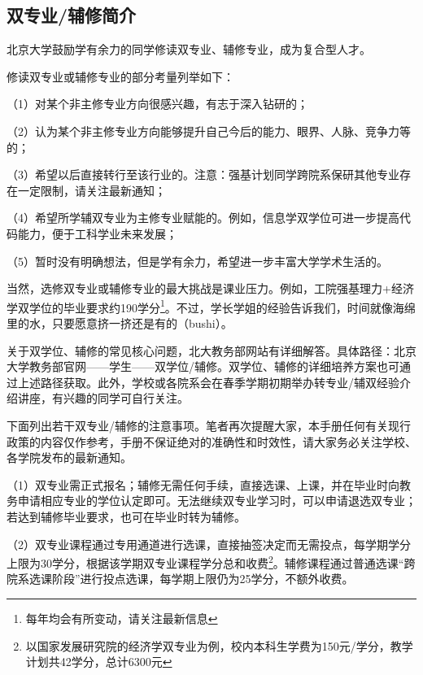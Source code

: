 \documentclass[11pt,oneside]{book}
\begin{document}
\subsection{双专业/辅修简介}
北京大学鼓励学有余力的同学修读双专业、辅修专业，成为复合型人才。

\vspace{10pt}

修读双专业或辅修专业的部分考量列举如下：

（1）对某个非主修专业方向很感兴趣，有志于深入钻研的；

（2）认为某个非主修专业方向能够提升自己今后的能力、眼界、人脉、竞争力等的；

（3）希望以后直接转行至该行业的。注意：强基计划同学跨院系保研其他专业存在一定限制，请关注最新通知；

（4）希望所学辅双专业为主修专业赋能的。例如，信息学双学位可进一步提高代码能力，便于工科学业未来发展；

（5）暂时没有明确想法，但是学有余力，希望进一步丰富大学学术生活的。

\vspace{10pt}

当然，选修双专业或辅修专业的最大挑战是课业压力。例如，工院强基理力+经济学双学位的毕业要求约190学分\footnote{每年均会有所变动，请关注最新信息}。不过，学长学姐的经验告诉我们，时间就像海绵里的水，只要愿意挤一挤还是有的（bushi）。

\vspace{10pt}

关于双学位、辅修的常见核心问题，北大教务部网站有详细解答。具体路径：北京大学教务部官网——学生——双学位/辅修。双学位、辅修的详细培养方案也可通过上述路径获取。此外，学校或各院系会在春季学期初期举办转专业/辅双经验介绍讲座，有兴趣的同学可自行关注。

\vspace{10pt}

下面列出若干双专业/辅修的注意事项。笔者再次提醒大家，本手册任何有关现行政策的内容仅作参考，手册不保证绝对的准确性和时效性，请大家务必关注学校、各学院发布的最新通知。

\vspace{10pt}

（1）双专业需正式报名；辅修无需任何手续，直接选课、上课，并在毕业时向教务申请相应专业的学位认定即可。无法继续双专业学习时，可以申请退选双专业；若达到辅修毕业要求，也可在毕业时转为辅修。

\vspace{10pt}

（2）双专业课程通过专用通道进行选课，直接抽签决定而无需投点，每学期学分上限为30学分，根据该学期双专业课程学分总和收费\footnote{以国家发展研究院的经济学双专业为例，校内本科生学费为150元/学分，教学计划共42学分，总计6300元}。辅修课程通过普通选课“跨院系选课阶段”进行投点选课，每学期上限仍为25学分，不额外收费。
\end{document}
